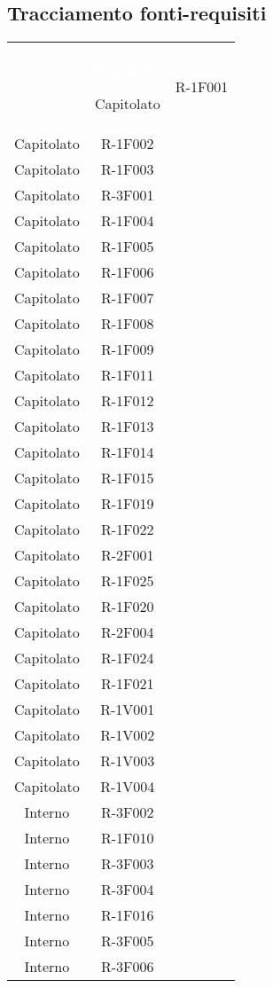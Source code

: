 \subsection{Tracciamento fonti-requisiti} 
\begin{tabularx}{\textwidth}{c|c}
	
	\rowcolor{greySWEight}
	\textcolor{white}{\textbf{Fonte}} &
	\textcolor{white}{\textbf{Requisito}}\endhead
	
	Capitolato & R-1F001\\
	Capitolato & R-1F002\\
	Capitolato & R-1F003\\
	Capitolato & R-3F001\\
	Capitolato & R-1F004\\
	Capitolato & R-1F005\\
	Capitolato & R-1F006\\
	Capitolato & R-1F007\\
	Capitolato & R-1F008\\
	Capitolato & R-1F009\\
	Capitolato & R-1F011\\
	Capitolato & R-1F012\\
	Capitolato & R-1F013\\
	Capitolato & R-1F014\\
	Capitolato & R-1F015\\
	Capitolato & R-1F019\\
	Capitolato & R-1F022\\
	Capitolato & R-2F001\\
	Capitolato & R-1F025\\
	Capitolato & R-1F020\\
	Capitolato & R-2F004\\
	Capitolato & R-1F024\\
	Capitolato & R-1F021\\
	Capitolato & R-1V001\\
	Capitolato & R-1V002\\
	Capitolato & R-1V003\\
	Capitolato & R-1V004\\
	Interno & R-3F002\\
	Interno & R-1F010\\
	Interno & R-3F003\\
	Interno & R-3F004\\
	Interno & R-1F016\\
	Interno & R-3F005\\
	Interno & R-3F006\\

\end{tabularx}
